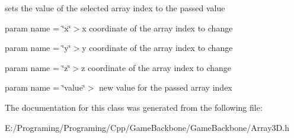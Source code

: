 sets the value of the selected array index to the passed value

param name = \char`\"{}x\char`\"{}$>$x coordinate of the array index to change

param name = \char`\"{}y\char`\"{}$>$y coordinate of the array index to change

param name = \char`\"{}z\char`\"{}$>$z coordinate of the array index to change

param name = \char`\"{}value\char`\"{}$>$ new value for the passed array index

The documentation for this class was generated from the following file\+:\begin{DoxyCompactItemize}
\item 
E\+:/\+Programing/\+Programing/\+Cpp/\+Game\+Backbone/\+Game\+Backbone/Array3\+D.\+h\end{DoxyCompactItemize}
